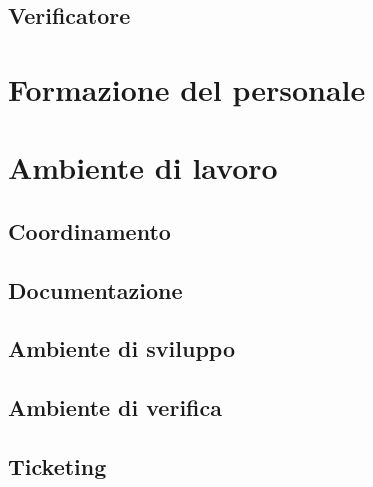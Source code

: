 \documentclass[main.tex]{subfiles}
\begin{document}
\subsection{Verificatore}

\section{Formazione del personale}

\section{Ambiente di lavoro}
\subsection{Coordinamento}
\subsection{Documentazione}
\subsection{Ambiente di sviluppo}
\subsection{Ambiente di verifica}
\subsection{Ticketing}
\end{document}
